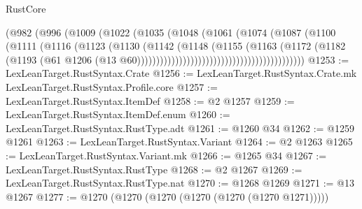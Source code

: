\begin{lexlean}{RustCore}
\begin{coremodule}
{\begin{coremodule}
{{{{{{{{{{{{{{{{{{{{{{{{{{{{{{{{{{{{{{{{{{{{{{{                                              (@982
                                                (@996
                                                  (@1009
                                                    (@1022
                                                      (@1035
                                                        (@1048
                                                          (@1061
                                                            (@1074
                                                              (@1087
                                                                (@1100
                                                                  (@1111
                                                                    (@1116
                                                                      (@1123
                                                                        (@1130
                                                                          (@1142
                                                                            (@1148
                                                                              (@1155
                                                                                (@1163
                                                                                  (@1172
                                                                                    (@1182
                                                                                      (@1193
                                                                                        (@61
                                                                                          @1206
                                                                                          (@13
                                                                                            @60))))))))))))))))))))))))))))))))))))))))))))
@1253 := LexLeanTarget.RustSyntax.Crate
@1256 := LexLeanTarget.RustSyntax.Crate.mk LexLeanTarget.RustSyntax.Profile.core
@1257 := LexLeanTarget.RustSyntax.ItemDef
@1258 := @2 @1257
@1259 := LexLeanTarget.RustSyntax.ItemDef.enum
@1260 := LexLeanTarget.RustSyntax.RustType.adt
@1261 := @1260 @34
@1262 := @1259 @1261
@1263 := LexLeanTarget.RustSyntax.Variant
@1264 := @2 @1263
@1265 := LexLeanTarget.RustSyntax.Variant.mk
@1266 := @1265 @34
@1267 := LexLeanTarget.RustSyntax.RustType
@1268 := @2 @1267
@1269 := LexLeanTarget.RustSyntax.RustType.nat
@1270 := @1268 @1269
@1271 := @13 @1267
@1277 := @1270 (@1270 (@1270 (@1270 (@1270 (@1270 @1271)))))
}}}}}}}}}}}}}}}}}}}}}}}}}}}}}}}}}}}}}}}}}}}}}}}
\end{coremodule}}
\end{coremodule}
\end{lexlean}
